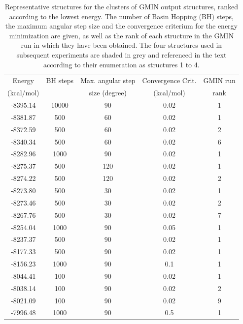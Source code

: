 \documentclass[english, a4paper, 12pt, titlepage, draft]{article}
\begin{document}
\begin{table}
\centering
\begin{tabular}{c c c c c}
    \hline \hline
    Energy     & BH steps & Max. angular step & Convergence Crit. & GMIN run \\ 
    (kcal/mol) &          & size (degree)     & (kcal/mol)        & rank     \\
    \hline
    \rowcolor{lightgray}
    -8395.14   & 10000    &  90               & 0.02              & 1        \\ 
    \rowcolor{lightgray}
    -8381.87   &   500    &  60               & 0.02              & 1        \\
    -8372.59   &   500    &  60               & 0.02              & 2        \\
    \rowcolor{lightgray}
    -8340.34   &   500    &  60               & 0.02              & 6        \\
    -8282.96   &  1000    &  90               & 0.02              & 1        \\
    \rowcolor{lightgray}
    -8275.37   &   500    & 120               & 0.02              & 1        \\
    -8274.22   &   500    & 120               & 0.02              & 2        \\
    -8273.80   &   500    &  30               & 0.02              & 1        \\
    -8273.46   &   500    &  30               & 0.02              & 2        \\
    -8267.76   &   500    &  30               & 0.02              & 7        \\
    -8254.04   &  1000    &  90               & 0.05              & 1        \\
    -8237.37   &   500    &  90               & 0.02              & 1        \\
    -8177.33   &   500    &  90               & 0.02              & 1        \\
    -8156.23   &  1000    &  90               & 0.1               & 1        \\
    -8044.41   &   100    &  90               & 0.02              & 1        \\
    -8038.14   &   100    &  90               & 0.02              & 2        \\
    -8021.09   &   100    &  90               & 0.02              & 9        \\
    -7996.48   &  1000    &  90               & 0.5               & 1        \\
    \hline \hline
\end{tabular}
\caption{Representative structures for the clusters of GMIN output structures, ranked according to the lowest energy.
The number of Basin Hopping (BH) steps, the maximum angular step size and the convergence criterium for the energy minimization are given, as well as the rank of each structure in the GMIN run in which they have been obtained.
    The four structures used in subsequent experiments are shaded in grey and referenced in the text according to their enumeration as structures 1 to 4.}
\label{tab:GMIN_structures}
\end{table} 
\end{document}

